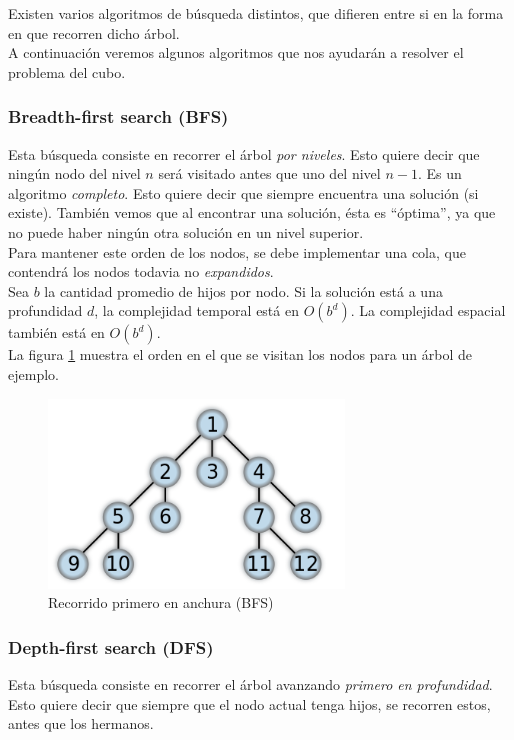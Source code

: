 \documentclass[11pt,a4paper]{article}
\begin{document}
Existen varios algoritmos de búsqueda distintos, que difieren entre si en la forma en que recorren dicho árbol.\\

A continuación veremos algunos algoritmos que nos ayudarán a resolver el problema del cubo.
\subsubsection{Breadth-first search (BFS)}
Esta búsqueda consiste en recorrer el árbol \emph{por niveles}. Esto quiere decir que ningún nodo del nivel $n$ será visitado antes que uno del nivel $n-1$.
Es un algoritmo \emph{completo}. Esto quiere decir que siempre encuentra una solución (si existe). También vemos que al encontrar una solución, ésta es ``óptima'', ya que no puede haber ningún otra solución en un nivel superior. \\

Para mantener este orden de los nodos, se debe implementar una cola, que contendrá los nodos todavia no \emph{expandidos}. \\

Sea $b$ la cantidad promedio de hijos por nodo. Si la solución está a una profundidad $d$, la complejidad temporal está en $O(b^d)$. La complejidad espacial también está en $O(b^d)$. \\  %

La figura \ref{fig:BFS} muestra el orden en el que se visitan los nodos para un árbol de ejemplo. \\

{
\begin{figure}[H]
  \centering
    \includegraphics[width=0.7\textwidth]{img/BFS}
  \caption{Recorrido primero en anchura (BFS)}
  \label{fig:BFS}
\end{figure}
}
\subsubsection{Depth-first search (DFS)}
Esta búsqueda consiste en recorrer el árbol avanzando \emph{primero en profundidad}. Esto quiere decir que siempre que el nodo actual tenga hijos, se recorren estos, antes que los hermanos. \\
\end{document}
